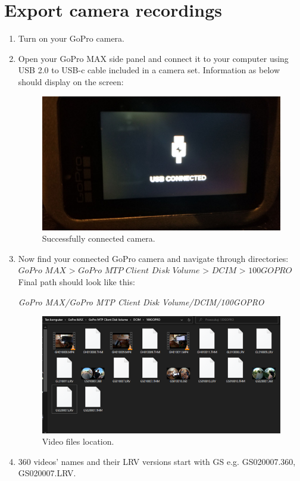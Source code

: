 \documentclass[a4paper,12pt]{book}
\begin{document}
\section{Export camera recordings}
\begin{enumerate}
\item Turn on your GoPro camera.
\item Open your GoPro MAX side panel and connect it to your computer using USB 2.0 to USB-c cable included in a camera set. Information as below should display on the screen:
\begin{figure}[H]
	\centering
	\includegraphics{camera_connected}
	\caption{Successfully connected camera.}
\end{figure} 

\item Now find your connected GoPro camera and navigate through directories:\\

$\textit{GoPro MAX > GoPro MTP Client Disk Volume > DCIM > 100GOPRO}$	\\

Final path should look like this:

\textit{GoPro MAX/GoPro MTP Client Disk Volume/DCIM/100GOPRO}	
\begin{figure}[H]
	\centering
	\includegraphics{recording_location}
	\caption{Video files location.}
\end{figure}
\hfill
\item 360 videos’ names and their LRV versions start with GS e.g. GS020007.360, GS020007.LRV.\\


\end{enumerate}
\end{document}
